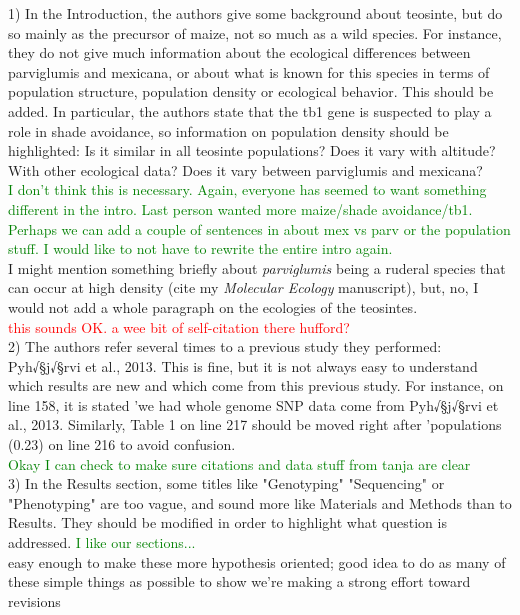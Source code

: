 \documentclass[11pt]{article}
\newcommand{\jri}[1]{\noindent \textcolor{red}{{#1}} \\}
\newcommand{\lev}[1]{\noindent \textcolor{green}{{#1}} \\}
\newcommand{\mbh}[1]{\noindent \textcolor{Dandelion}{{#1}}\\}
\begin{document}
1) In the Introduction, the authors give some background about teosinte, but do so mainly as the precursor of maize, not so much as a wild species. For instance, they do not give much information about the ecological differences between parviglumis and mexicana, or about what is known for this species in terms of population structure, population density or ecological behavior. This should be added. In particular, the authors state that the tb1 gene is suspected to play a role in shade avoidance, so information on population density should be highlighted: Is it similar in all teosinte populations? Does it vary with altitude? With other ecological data? Does it vary between parviglumis and mexicana?\\

\lev{I don't think this is necessary. Again, everyone has seemed to want something different in the intro. Last person wanted more maize/shade avoidance/tb1. Perhaps we can add a couple of sentences in about mex vs parv or the population stuff. I would like to not have to rewrite the entire intro again.}

\mbh{I might mention something briefly about \emph{parviglumis} being a ruderal species that can occur at high density (cite my \emph{Molecular Ecology} manuscript), but, no, I would not add a whole paragraph on the ecologies of the teosintes.}
\jri{this sounds OK. a wee bit of self-citation there hufford?}

2) The authors refer several times to a previous study they performed: Pyh√§j√§rvi et al., 2013. This is fine, but it is not always easy to understand which results are new and which come from this previous study. For instance, on line 158, it is stated 'we had whole genome SNP data come from Pyh√§j√§rvi et al., 2013. Similarly, Table 1 on line 217 should be moved right after 'populations (0.23) on line 216 to avoid confusion.\\

\lev{Okay I can check to make sure citations and data stuff from tanja are clear}

3) In the Results section, some titles like "Genotyping" "Sequencing" or "Phenotyping" are too vague, and sound more like Materials and Methods than to Results. They should be modified in order to highlight what question is addressed.
 \lev{I like our sections...}
 \mbh{easy enough to make these more hypothesis oriented; good idea to do as many of these simple things as possible to show we're making a strong effort toward revisions}
\end{document}
